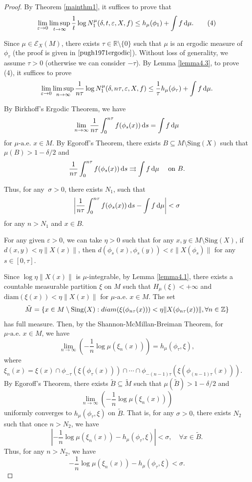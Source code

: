 \documentclass[10pt]{article}
\newtheorem*{Theorem A}{Theorem A}
\begin{document}
\begin{proof}
By Theorem \ref{mainthm1}, it suffices to prove that
\[
\lim_{\varepsilon \to 0} \limsup_{t \to \infty} \frac{1}{t} \log N_1^\mu(\delta, t, \varepsilon, X, f)
\leq h_\mu(\phi_1) + \int f \, {\rm d}\mu. \tag{4}
\]

Since \( \mu \in \mathcal{E}_X(M) \), there exists \( \tau \in \mathbb{R} \setminus \{0\} \) such that \( \mu \) is an ergodic measure of \( \phi_\tau \) (the proof is given in \( \cite{pugh1971ergodic}\)). Without loss of generality, we assume \( \tau > 0 \) (otherwise we can consider \( -\tau \)). By Lemma \ref{lemma4.3}, to prove (4), it suffices to prove
\[
\lim_{\varepsilon \to 0} \limsup_{n \to \infty} \frac{1}{n\tau} \log N_1^\mu(\delta, n\tau, \varepsilon, X, f)
\leq \frac{1}{\tau}h_\mu(\phi_\tau) + \int f \, {\rm d}\mu.
\]


\noindent
By Birkhoff's Ergodic Theorem, we have
\[
\lim_{n \to \infty} \frac{1}{n\tau} \int_0^{n\tau} f(\phi_s(x)) \, {\rm d}s
= \int f \, {\rm d}\mu
\]
for \(\mu\text{-a.e. } x \in M\). By Egoroff's Theorem, there exists \( B \subseteq M \setminus \text{Sing}(X) \) such that \( \mu(B) > 1 - {\delta}/{2} \) and
\[
\frac{1}{n\tau} \int_0^{n\tau} f(\phi_s(x)) \, {\rm d}s
\rightrightarrows \int f \, {\rm d}\mu
\quad \text{  on  } B .
\]

\noindent
Thus, for any \(\ \sigma > 0\), there exists \(N_1\), such that
\[
\left| \frac{1}{n\tau} \int_{0}^{n\tau} f(\phi_{s}(x)) \, {\rm d}s - \int f \, {\rm d}\mu \right| < \sigma
\]
for any \(n > N_1\) and $x \in B$.

For any given \( \varepsilon > 0 \), we can take \( \eta > 0 \) such that for any \( x,y \in M \setminus \text{Sing}(X) \), if \( d(x,y) < \eta \|X(x)\| \), then
\(d(\phi_{s}(x), \phi_{s}(y)) < \varepsilon \|X(\phi_{s})\|\) for any \(s\in[0,\tau]\).

Since \( \log \eta \|X(x)\| \) is \( \mu \)-integrable, by Lemma \ref{lemma4.1}, there exists a countable measurable partition \( \xi \) on \( M \) such that \( H_\mu(\xi) < +\infty \) and \( \text{diam}(\xi(x)) < \eta \|X(x)\| \) for \( \mu \)-a.e. \( x \in M \). The set $$\tilde{M}=\{x\in M\setminus{\rm Sing}(X) : diam(\xi(\phi_{n\tau}(x)))< \eta\|X(\phi_{n\tau}(x))\|, \forall n\in\mathbb{Z}\}$$ has full measure.
Then, by the Shannon-McMillan-Breiman Theorem, for \(\mu\text{-a.e. } x \in M\), we have
\[
\lim\limits_{n \to \infty} \left( -\frac{1}{n} \log \mu(\xi_n(x)) \right) = h_{\mu}(\phi_\tau, \xi),
\]
where \(\xi_n(x) = \xi(x) \cap \phi_{-\tau}(\xi(\phi_{\tau}(x))) \cap \cdots \cap \phi_{-(n - 1)\tau}(\xi(\phi_{(n - 1)\tau}(x)))\). By Egoroff's Theorem, there exists \( \tilde{B} \subseteq \tilde{M}\) such that $\mu(\tilde{B})> 1-\delta/2$ and
\[
\lim\limits_{n \to \infty} \left( -\frac{1}{n} \log \mu(\xi_n(x)) \right)
\]
uniformly converges to \( h_{\mu}(\phi_\tau, \xi) \) on \( \tilde{B} \). That is, for any \( \sigma > 0 \), there exists \( N_2 \) such that once \( n > N_2 \), we have
\[
\left| -\frac{1}{n} \log \mu(\xi_n(x)) - h_\mu(\phi_\tau, \xi) \right| < \sigma, \quad \forall x \in \tilde{B}.
\]
Thus, for any \( n > N_2 \), we have
\[
-\frac{1}{n} \log \mu(\xi_n(x)) - h_\mu(\phi_\tau, \xi) < \sigma.
\]


\end{proof}
\end{document}
